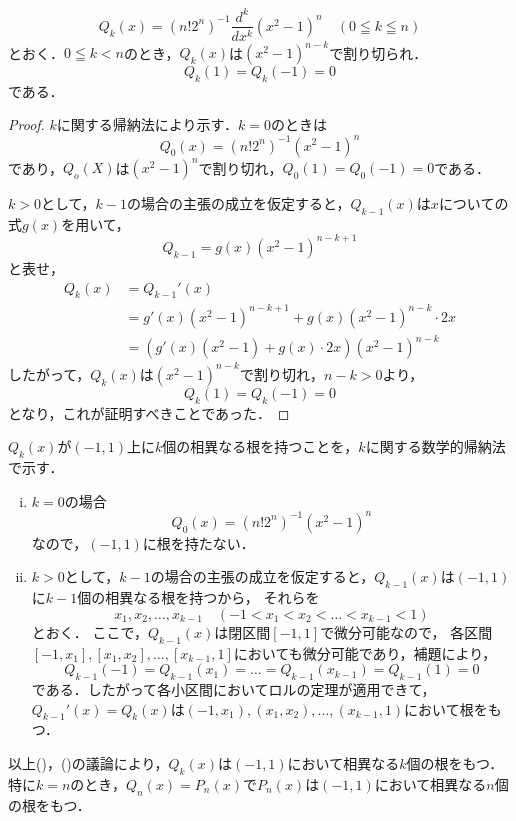 
\begin{lemma}{}{}
  \[
    Q_k (x)= (n! 2^n)^{-1} \frac{d^k}{dx^k} (x^2-1)^n \quad (0 \leqq k \leqq n)
  \]
  とおく．$0 \leqq k <n$のとき，$Q_k (x)$は$(x^2-1)^{n-k}$で割り切られ．
  \[
    Q_k (1)= Q_k(-1)=0
  \]
  である．
\end{lemma}

\begin{proof}
  $k$に関する帰納法により示す．$k=0$のときは
  \[
    Q_0(x)= (n! 2^n)^{-1} (x^2-1)^n
  \]
  であり，$Q_o(X)$は$(x^2-1)^n$で割り切れ，$Q_0(1)=Q_0(-1)=0$である．

  $k>0$として，$k-1$の場合の主張の成立を仮定すると，$Q_{k-1}(x)$は$x$についての式$g(x)$を用いて，
  \[
    Q_{k-1} = g(x)(x^2-1)^{n-k+1}
  \]
  と表せ，
  \begin{align*}
    Q_k (x) & =Q_{k-1}' (x)                                        \\
            & = g'(x)(x^2-1)^{n-k+1} + g(x) (x^2-1)^{n-k} \cdot 2x \\
            & =(g'(x)(x^2-1)+g(x) \cdot 2x) (x^2-1)^{n-k}
  \end{align*}
  したがって，$Q_k(x)$は$(x^2-1)^{n-k}$で割り切れ，$n-k >0$より，
  \[
    Q_k (1)= Q_k(-1)=0
  \]
  となり，これが証明すべきことであった．
\end{proof}

\begin{tproof}
  $Q_k (x)$が$(-1,1)$上に$k$個の相異なる根を持つことを，$k$に関する数学的帰納法で示す．
  \begin{enumerate}[(i)]
    \item $k=0$の場合
          \[
            Q_0(x)= (n! 2^n)^{-1} (x^2-1)^n
          \]
          なので，$(-1,1)$に根を持たない．
    \item $k>0$として，$k-1$の場合の主張の成立を仮定すると，$Q_{k-1}(x)$は$(-1,1)$に$k-1$個の相異なる根を持つから，
          それらを
          \[
            x_1,x_2,\dots,x_{k-1}\quad (-1<x_1<x_2<\dots <x_{k-1}<1)
          \]とおく．
          ここで，$Q_{k-1} (x)$は閉区間$[-1,1]$で微分可能なので，
          各区間$[-1,x_1],[x_1,x_2],\dots,[x_{k-1},1]$においても微分可能であり，補題により，
          \[
            Q_{k-1} (-1) = Q_{k-1}(x_1)=\dots = Q_{k-1}(x_{k-1})=Q_{k-1}(1)=0
          \]
          である．したがって各小区間においてロルの定理が適用できて，$Q_{k-1}' (x)=Q_k(x)$は$(-1,x_1),(x_1,x_2),\dots,(x_{k-1},1)$において根をもつ．
  \end{enumerate}
  以上()，()の議論により，$Q_k (x)$は$(-1,1)$において相異なる$k$個の根をもつ．
  特に$k=n$のとき，$Q_n (x)=P_n(x)$で$P_n (x)$は$(-1,1)$において相異なる$n$個の根をもつ．
\end{tproof}



